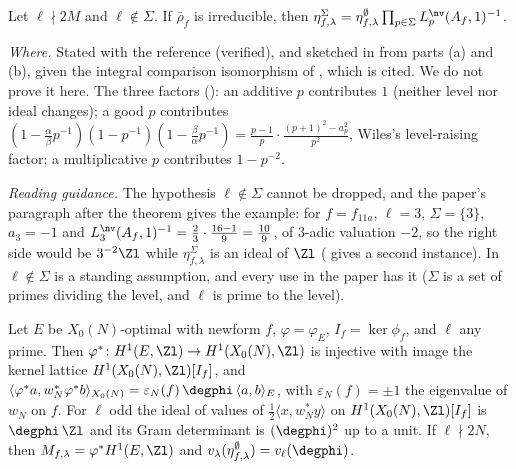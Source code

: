 \begin{sloppypar}
\begin{theorem}\label{thm:paper:dfg14}
Let $\ell\nmid2M$ and $\ell\notin\Sigma$. If $\bar\rho_f$ is irreducible, then $\eta^\Sigma_{f,\lambda}=\eta^\emptyset_{f,\lambda}\prod_{p\in\Sigma}L^{\nv}_p(A_f,1)^{-1}$.
\end{theorem}

\noindent\emph{Where.} Stated with the reference \cite[Proposition 1.4(c)]{DFG04} (verified), and sketched in  from parts (a) and (b), given the integral
comparison isomorphism of \cite{DFG04}, which is cited. We do not prove it here. The three factors (): an additive $p$ contributes $1$ (neither level nor
ideal changes); a good $p$ contributes $(1-\frac\alpha\beta p^{-1})(1-p^{-1})(1-\frac\beta\alpha p^{-1})=\frac{p-1}p\cdot\frac{(p+1)^2-a_p^2}{p^2}$, Wiles's level-raising factor; a multiplicative $p$ contributes
$1-p^{-2}$.

\noindent\emph{Reading guidance.} The hypothesis $\ell\notin\Sigma$ cannot be dropped, and the paper's paragraph after the theorem gives the example: for $f=f_{11a}$, $\ell=3$,
$\Sigma=\{3\}$, $a_3=-1$ and $L^{\nv}_3(A_f,1)^{-1}=\frac23\cdot\frac{16-1}9=\frac{10}9$, of $3$-adic valuation $-2$, so the right side would be $3^{-2}\Zl$ while $\eta^\Sigma_{f,\lambda}$ is an
ideal of $\Zl$ ( gives a second instance). In \cite[Section 1.7.3]{DFG04} $\ell\notin\Sigma$ is a standing assumption, and every use in the paper has it
($\Sigma$ is a set of primes dividing the level, and $\ell$ is prime to the level).

\begin{proposition}\label{prop:paper:pullback}
Let $E$ be $X_0(N)$-optimal with newform $f$, $\varphi=\varphi_E$, $I_f=\ker\phi_f$, and $\ell$ any prime. Then $\varphi^*\colon H^1(E,\Zl)\to H^1(X_0(N),\Zl)$ is injective with image the kernel lattice
$H^1(X_0(N),\Zl)[I_f]$, and $\langle\varphi^*a,w_N^*\varphi^*b\rangle_{X_0(N)}=\varepsilon_N(f)\,\degphi\,\langle a,b\rangle_E$, with $\varepsilon_N(f)=\pm1$ the eigenvalue of $w_N$ on $f$. For $\ell$ odd the ideal of values of
$\frac12\langle x,w_N^*y\rangle$ on $H^1(X_0(N),\Zl)[I_f]$ is $\degphi\,\Zl$ and its Gram determinant is $(\degphi)^2$ up to a unit. If $\ell\nmid2N$, then
$M_{f,\lambda}=\varphi^*H^1(E,\Zl)$ and $v_\lambda(\eta^\emptyset_{f,\lambda})=v_\ell(\degphi)$.
\end{proposition}


\end{sloppypar}
